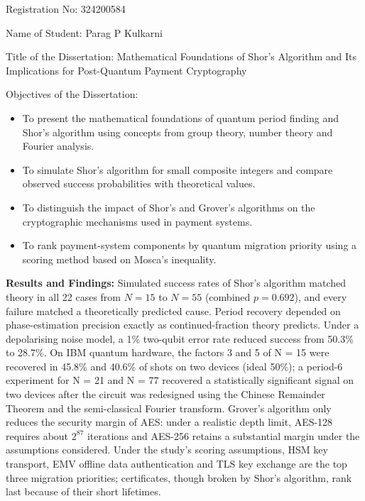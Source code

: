 \documentclass[12pt,oneside]{report}
\begin{document}
Registration No: 324200584
\par

Name of Student: Parag P Kulkarni
\par

Title of the Dissertation: Mathematical Foundations of Shor's Algorithm and Its Implications for Post-Quantum Payment Cryptography
\par

Objectives of the Dissertation:

\begin{itemize}

\item To present the mathematical foundations of quantum period finding and Shor's algorithm using concepts from group theory, number theory and Fourier analysis.
\par

\item To simulate Shor's algorithm for small composite integers and compare observed success probabilities with theoretical values.
\par

\item To distinguish the impact of Shor's and Grover's algorithms on the cryptographic mechanisms used in payment systems.
\par

\item To rank payment-system components by quantum migration priority using a scoring method based on Mosca's inequality.
\end{itemize}
\par

\textbf{Results and Findings:} Simulated success rates of Shor's algorithm matched theory in all 22 cases from $N = 15$ to $N = 55$ (combined $p = 0.692$), and every failure matched a theoretically predicted cause. Period recovery depended on phase-estimation precision exactly as continued-fraction theory predicts. Under a depolarising noise model, a 1\% two-qubit error rate reduced success from 50.3\% to 28.7\%. On IBM quantum hardware, the factors 3 and 5 of N = 15 were recovered in 45.8\% and 40.6\% of shots on two devices (ideal 50\%); a period-6 experiment for N = 21 and N = 77 recovered a statistically significant signal on two devices after the circuit was redesigned using the Chinese Remainder Theorem and the semi-classical Fourier transform. Grover's algorithm only reduces the security margin of AES: under a realistic depth limit, AES-128 requires about $2^{87}$ iterations and AES-256 retains a substantial margin under the assumptions considered. Under the study's scoring assumptions, HSM key transport, EMV offline data authentication and TLS key exchange are the top three migration priorities; certificates, though broken by Shor's algorithm, rank last because of their short lifetimes.
\par
\end{document}
